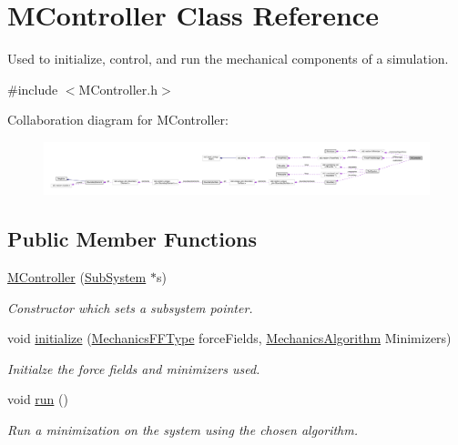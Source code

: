 \hypertarget{classMController}{\section{M\+Controller Class Reference}
\label{classMController}
}


Used to initialize, control, and run the mechanical components of a simulation.  




{\ttfamily \#include $<$M\+Controller.\+h$>$}



Collaboration diagram for M\+Controller\+:\nopagebreak
\begin{figure}[H]
\begin{center}
\leavevmode
\includegraphics[width=350pt]{classMController__coll__graph}
\end{center}
\end{figure}
\subsection*{Public Member Functions}
\begin{DoxyCompactItemize}
\item 
\hyperlink{classMController_a526f67950e7cdabe20330264b22721d7}{M\+Controller} (\hyperlink{classSubSystem}{Sub\+System} $\ast$s)
\begin{DoxyCompactList}\small\item\em Constructor which sets a subsystem pointer. \end{DoxyCompactList}\item 
void \hyperlink{classMController_a4187b5d2f2e2255af57c4525285058b0}{initialize} (\hyperlink{structMechanicsFFType}{Mechanics\+F\+F\+Type} force\+Fields, \hyperlink{structMechanicsAlgorithm}{Mechanics\+Algorithm} Minimizers)
\begin{DoxyCompactList}\small\item\em Initialze the force fields and minimizers used. \end{DoxyCompactList}\item 
void \hyperlink{classMController_ad120213292e23f5549d53fe2df3d2ffd}{run} ()
\begin{DoxyCompactList}\small\item\em Run a minimization on the system using the chosen algorithm. \end{DoxyCompactList}\end{DoxyCompactItemize}

